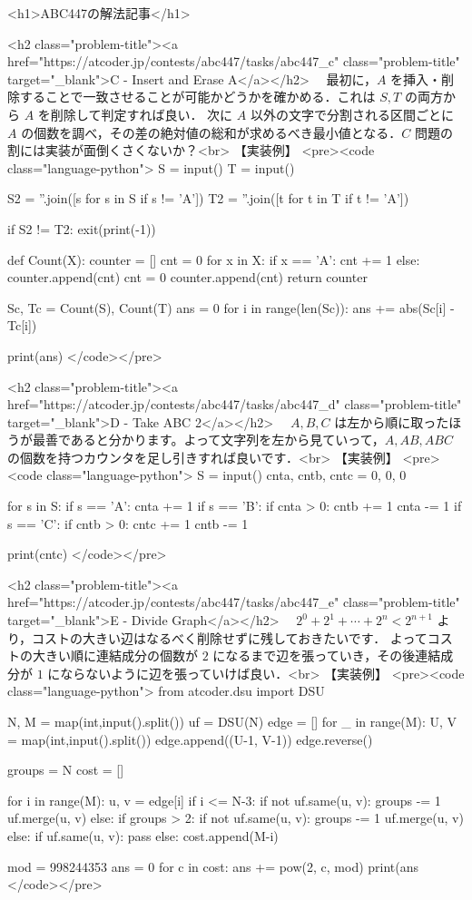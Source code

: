 <h1>ABC447の解法記事</h1>

<h2 class="problem-title"><a href="https://atcoder.jp/contests/abc447/tasks/abc447_c" class="problem-title" target="_blank">C - Insert and Erase A</a></h2>
　最初に，$A$ を挿入・削除することで一致させることが可能かどうかを確かめる．これは $S, T$ の両方から $A$ を削除して判定すれば良い．
 次に $A$ 以外の文字で分割される区間ごとに $A$ の個数を調べ，その差の絶対値の総和が求めるべき最小値となる．$C$ 問題の割には実装が面倒くさくないか？<br>
【実装例】
<pre><code class="language-python">
S = input()
T = input()

S2 = ''.join([s for s in S if s != 'A'])
T2 = ''.join([t for t in T if t != 'A'])

if S2 != T2:
    exit(print(-1))

def Count(X):
    counter = []
    cnt = 0
    for x in X:
        if x == 'A':
            cnt += 1
        else:
            counter.append(cnt)
            cnt = 0
    counter.append(cnt)
    return counter

Sc, Tc = Count(S), Count(T)
ans = 0
for i in range(len(Sc)):
    ans += abs(Sc[i] - Tc[i])

print(ans)
</code></pre>

<h2 class="problem-title"><a href="https://atcoder.jp/contests/abc447/tasks/abc447_d" class="problem-title" target="_blank">D -  Take ABC 2</a></h2>
　$A, B, C$ は左から順に取ったほうが最善であると分かります。よって文字列を左から見ていって，$A, AB, ABC$ の個数を持つカウンタを足し引きすれば良いです．<br>
【実装例】
<pre><code class="language-python">
S = input()
cnta, cntb, cntc = 0, 0, 0

for s in S:
    if s == 'A':
        cnta += 1
    if s == 'B':
        if cnta > 0:
            cntb += 1
            cnta -= 1
    if s == 'C':
        if cntb > 0:
            cntc += 1
            cntb -= 1

print(cntc)
</code></pre>

<h2 class="problem-title"><a href="https://atcoder.jp/contests/abc447/tasks/abc447_e" class="problem-title" target="_blank">E - Divide Graph</a></h2>
　$2^0 + 2^1 + \cdots + 2^{n} < 2^{n+1}$ より，コストの大きい辺はなるべく削除せずに残しておきたいです．
 よってコストの大きい順に連結成分の個数が $2$ になるまで辺を張っていき，その後連結成分が $1$ にならないように辺を張っていけば良い．<br>
【実装例】
<pre><code class="language-python">
from atcoder.dsu import DSU

N, M = map(int,input().split())
uf = DSU(N)
edge = []
for _ in range(M):
    U, V = map(int,input().split())
    edge.append((U-1, V-1))
edge.reverse()

groups = N
cost = []

for i in range(M):
    u, v = edge[i]
    if i <= N-3:
        if not uf.same(u, v):
            groups -= 1
        uf.merge(u, v)
    else:
        if groups > 2:
            if not uf.same(u, v):
                groups -= 1
            uf.merge(u, v)
        else:
            if uf.same(u, v):
                pass
            else:
                cost.append(M-i)

mod = 998244353
ans = 0
for c in cost:
    ans += pow(2, c, mod)
print(ans %
</code></pre>
